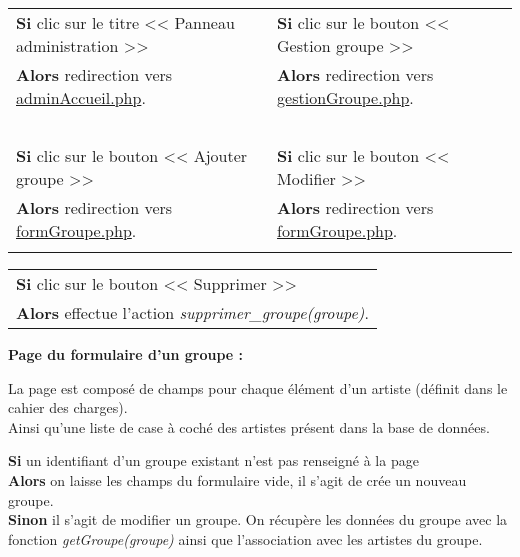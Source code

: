             \begin{center}
                \begin{tabular}{l | l}
                    \textbf{Si} clic sur le titre << Panneau administration >> & \textbf{Si} clic sur le bouton << Gestion groupe >> \\
                    \textbf{Alors} redirection vers \underline{adminAccueil.php}. & \textbf{Alors} redirection vers \underline{gestionGroupe.php}. \\ \\

                    \textbf{Si} clic sur le bouton << Ajouter groupe >> & \textbf{Si} clic sur le bouton << Modifier >> \\
                    \textbf{Alors} redirection vers \underline{formGroupe.php}. & \textbf{Alors} redirection vers \underline{formGroupe.php}. \\ \\
                \end{tabular}

                \begin{tabular}{l}
                    \textbf{Si} clic sur le bouton << Supprimer >> \\
                    \textbf{Alors} effectue l'action \emph{supprimer\_groupe(groupe)}.
                \end{tabular}
            \end{center}
            
            
        \clearpage
        
            \begin{paragraphe}
                \textbf{Page du formulaire d'un groupe :}
            \end{paragraphe}
            
            \begin{paragraphe}
                La page est composé de champs pour chaque élément d'un artiste (définit dans le cahier des charges). \\
                Ainsi qu'une liste de case à coché des artistes présent dans la base de données.
            \end{paragraphe}

            \begin{paragraphe}
                \textbf{Si} un identifiant d'un groupe existant n'est pas renseigné à la page \\
                \textbf{Alors} on laisse les champs du formulaire vide, il s'agit de crée un nouveau groupe. \\
                \textbf{Sinon} il s'agit de modifier un groupe. On récupère les données du groupe avec la fonction \emph{getGroupe(groupe)} ainsi que l'association avec les artistes du groupe.
            \end{paragraphe}
            
